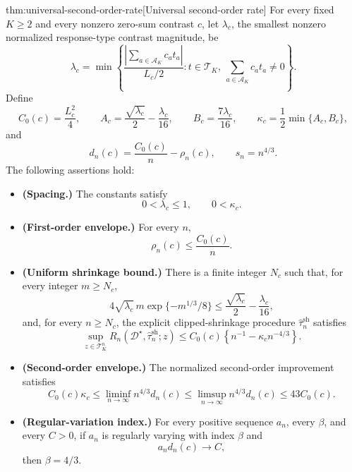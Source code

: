 \documentclass[11pt]{article}
\begin{document}
\begin{theoremv}{thm:universal-second-order-rate}[Universal second-order rate]
For every fixed \(K\geq 2\) and every nonzero zero-sum contrast \(c\), let \(\lambda_c\), the smallest nonzero normalized response-type contrast magnitude, be
\[
\lambda_c
=
\min\left\{
\frac{\left|\sum_{a\in\mathcal A_K} c_a t_a\right|}{L_c/2}
:
t\in\mathcal T_K,\ 
\sum_{a\in\mathcal A_K} c_a t_a\neq 0
\right\}.
\]
Define
\[
C_0(c)=\frac{L_c^2}{4},
\qquad
A_c=\frac{\sqrt{\lambda_c}}{2}-\frac{\lambda_c}{16},
\qquad
B_c=\frac{7\lambda_c}{16},
\qquad
\kappa_c=\frac{1}{2}\min\{A_c,B_c\},
\]
and
\[
d_n(c)=\frac{C_0(c)}{n}-\rho_n(c),
\qquad
s_n=n^{4/3}.
\]
The following assertions hold:
\begin{itemize}
\item \textbf{(Spacing.)} The constants satisfy
\[
0<\lambda_c\leq 1,
\qquad
0<\kappa_c.
\]

\item \textbf{(First-order envelope.)} For every \(n\),
\[
\rho_n(c)\leq \frac{C_0(c)}{n}.
\]

\item \textbf{(Uniform shrinkage bound.)} There is a finite integer \(N_c\) such that, for every integer \(m\geq N_c\),
\[
4\sqrt{\lambda_c}\,m\exp\{-m^{1/3}/8\}
\leq
\frac{\sqrt{\lambda_c}}{2}-\frac{\lambda_c}{16},
\]
and, for every \(n\geq N_c\), the explicit clipped-shrinkage procedure \(\widehat\tau_n^{\mathrm{sh}}\) satisfies
\[
\sup_{z\in\mathcal T_K^n}
R_n(\mathcal D^\star,\widehat\tau_n^{\mathrm{sh}};z)
\leq
C_0(c)\left\{n^{-1}-\kappa_c n^{-4/3}\right\}.
\]

\item \textbf{(Second-order envelope.)} The normalized second-order improvement satisfies
\[
C_0(c)\kappa_c
\leq
\liminf_{n\to\infty} n^{4/3}d_n(c)
\leq
\limsup_{n\to\infty} n^{4/3}d_n(c)
\leq
43C_0(c).
\]

\item \textbf{(Regular-variation index.)} For every positive sequence \(a_n\), every \(\beta\), and every \(C>0\), if \(a_n\) is regularly varying with index \(\beta\) and
\[
a_n d_n(c)\to C,
\]
then \(\beta=4/3\).
\end{itemize}
\end{theoremv}
\end{document}

